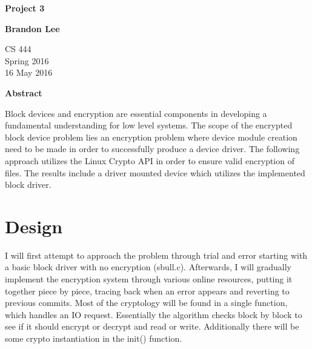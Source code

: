\documentclass[letterpaper,10pt,titlepage]{article}
\begin{document}
\begin{titlepage}
    \begin{center}
        \vspace*{3.5cm}

        \textbf{Project 3}

        \vspace{0.5cm}

        \textbf{Brandon Lee}

        \vspace{0.8cm}

        CS 444\\
        Spring 2016\\
        16 May 2016\\

        \vspace{1cm}

        \textbf{Abstract}\\

        \vspace{0.5cm}

        Block devices and encryption are essential components in developing a fundamental understanding for low level systems.  The scope of the encrypted block device problem lies an encryption problem where device module creation need to be made in order to successfully produce a device driver.  The following approach utilizes the Linux Crypto API in order to ensure valid encryption of files.  The results include a driver mounted device which utilizes the implemented block driver.


        \vfill



    \end{center}
\end{titlepage}

\newpage

\section{Design}

I will first attempt to approach the problem through trial and error starting with a basic block driver with no encryption (sbull.c).  Afterwards, I will gradually implement the encryption system through various online resources, putting it together piece by piece, tracing back when an error appears and reverting to previous commits.  Most of the cryptology will be found in a single function, which handles an IO request.  Essentially the algorithm checks block by block to see if it should encrypt or decrypt and read or write.  Additionally there will be some crypto instantiation in the init() function.\\
\end{document}
